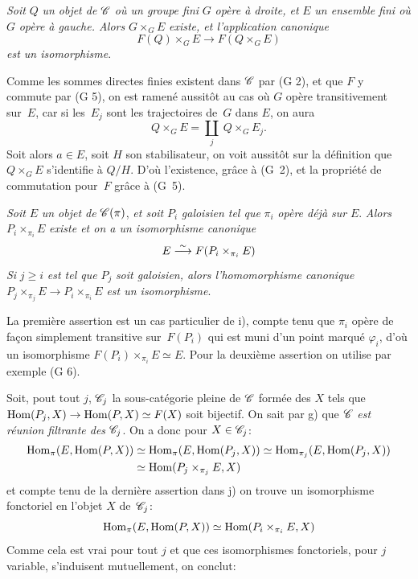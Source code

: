 \begin{enumerateb}
\item[i)] \emph{Soit} $Q$ \emph{un objet de} $\cal{C}$ \emph{où un
groupe fini} $G$ \emph{opère à droite, et} $E$ \emph{un
ensemble fini où} $G$ \emph{opère à gauche. Alors} $G
\times_G E$ \emph{existe, et l'application canonique}
$$
F(Q) \times_G E \to F(Q \times_G E)
$$
\emph{est un isomorphisme}.

Comme les sommes directes finies existent dans $\cal{C}$ par (G 2), et
que $F$ y commute par (G 5), on est ramen\'e aussit\^ot au cas
o\`u $G$ op\`ere transitivement sur~$E$, car si les~$E_j$ sont les
trajectoires de~$G$ dans $E$, on aura
$$
Q \times_G E = \underset {j}{\amalg}\ Q \times_G E_j.
$$
Soit alors $a \in E$, soit $H$ son stabilisateur, on voit aussit\^ot
sur la d\'efinition que $Q \times_G E$ s'identifie \`a $Q/H$.
D'o\`u l'existence, gr\^ace \`a (G~2), et la propri\'et\'e
de commutation pour~$F$ gr\^ace \`a (G~5).

\item[j)] \emph{Soit} $E$ \emph{un objet de} $\cal{C}(\pi)$, \emph{et
soit} $P_i$ \emph{galoisien tel que} $\pi_i$ \emph{opère
déjà sur} $E$. \emph{Alors} $P_i \times_{\pi_i} E$
\emph{existe et on a un isomorphisme canonique}
$$
E \overset{\sim}{\longrightarrow} F(P_i \times_{\pi_i} E)
$$
\emph{Si} $j \geq i$ \emph{est tel que} $P_j$ \emph{soit galoisien,
alors l'homomorphisme canonique} $P_j \times_{\pi_j} E \to P_i
\times_{\pi_i} E$ \emph{est un isomorphisme}.

La premi\`ere assertion est un cas particulier de i), compte tenu
que $\pi_i$ op\`ere de fa\c con simplement transitive sur~$F(P_i)$
qui est muni d'un point marqu\'e $\varphi_i$, d'o\`u un isomorphisme
$F(P_i) \times_{\pi_i} E \simeq E$. Pour la deuxi\`eme assertion on
utilise par exemple (G 6).

Soit, pout tout $j$, $\cal{C}_j$ la sous-cat\'egorie pleine de
$\cal{C}$ form\'ee des $X$ tels que $\Hom(P_j,X) \to \Hom(P,X)
\simeq F(X)$ soit bijectif. On sait par g) que $\cal{C}$ \emph{est
réunion filtrante des} $\cal{C}_j$. On a donc pour $X \in
\cal{C}_j$:
\begin{align*}
\operatorname{Hom}_{\pi}(E,\operatorname{Hom}(P,X)) & \simeq \operatorname{Hom}_{\pi}(E,\operatorname{Hom}(P_j,X)) \simeq
\operatorname{Hom}_{\pi_j}(E,\operatorname{Hom}(P_j,X))\\ & \simeq \operatorname{Hom}(P_j \times_{\pi_j} E,X)
\end{align*}
et
compte tenu de la derni\`ere assertion dans j) on trouve un
isomorphisme fonctoriel en l'objet $X$ de~$\cal{C}_j$:
$$
\operatorname{Hom}_{\pi}(E,\operatorname{Hom}(P,X)) \simeq \operatorname{Hom}(P_i \times_{\pi_i} E,X)
$$
Comme cela est vrai pour tout $j$ et que ces isomorphismes fonctoriels,
pour $j$ variable, s'induisent mutuellement, on conclut:


\end{enumerateb}
